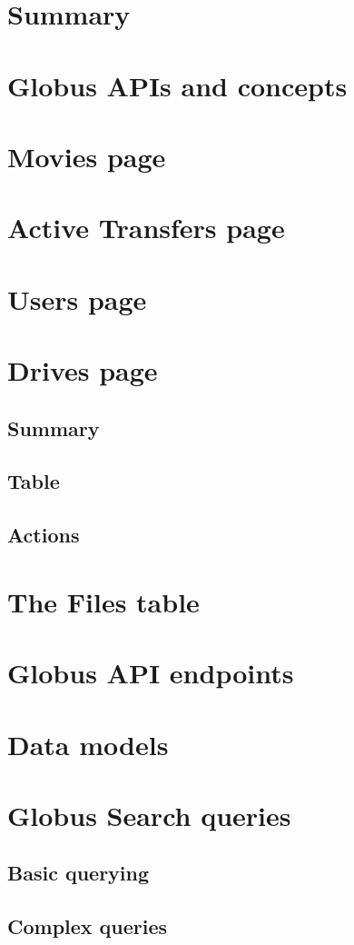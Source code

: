 \documentclass{report}
\begin{document}
\maketitle
\tableofcontents

\chapter{Summary}


\chapter{Globus APIs and concepts}


\chapter{Movies page}


\chapter{Active Transfers page}


\chapter{Users page}


\chapter{Drives page}
\section{Summary}
\section{Table}
\section{Actions}

\appendix

\chapter{The Files table}

\chapter{Globus API endpoints\label{appendix:globusapis}}


\chapter{Data models}


\chapter{Globus Search queries}
\section{Basic querying}
\section{Complex queries}
\end{document}
